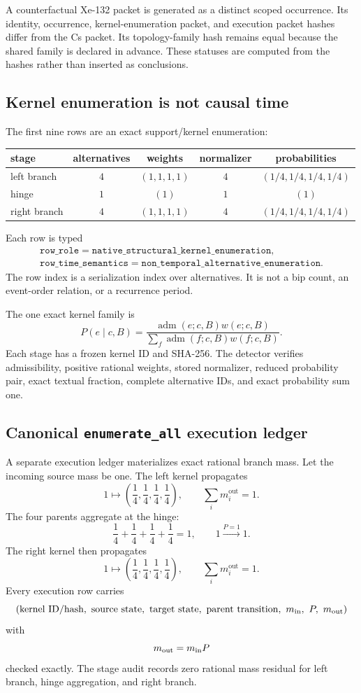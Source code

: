 A counterfactual Xe-132 packet is generated as a distinct scoped occurrence. Its identity, occurrence, kernel-enumeration packet, and execution packet hashes differ from the Cs packet. Its topology-family hash remains equal because the shared family is declared in advance. These statuses are computed from the hashes rather than inserted as conclusions.

\subsection{Kernel enumeration is not causal time}

The first nine rows are an exact support/kernel enumeration:
\begin{center}
\begin{tabular}{@{}lcccc@{}}
\toprule
stage & alternatives & weights & normalizer & probabilities\\
\midrule
left branch  & $4$ & $(1,1,1,1)$ & $4$ & $(1/4,1/4,1/4,1/4)$\\
hinge        & $1$ & $(1)$       & $1$ & $(1)$\\
right branch & $4$ & $(1,1,1,1)$ & $4$ & $(1/4,1/4,1/4,1/4)$\\
\bottomrule
\end{tabular}
\end{center}
Each row is typed
\[
\begin{gathered}
\texttt{row\_role}=\texttt{native\_structural\_kernel\_enumeration},\\
\texttt{row\_time\_semantics}=\texttt{non\_temporal\_alternative\_enumeration}.
\end{gathered}
\]
The row index is a serialization index over alternatives. It is not a bip count, an event-order relation, or a recurrence period.

The one exact kernel family is
\[
P(e\mid c,B)
=
\frac{\operatorname{adm}(e;c,B)w(e;c,B)}
{\sum_f\operatorname{adm}(f;c,B)w(f;c,B)}.
\]
Each stage has a frozen kernel ID and SHA-256. The detector verifies admissibility, positive rational weights, stored normalizer, reduced probability pair, exact textual fraction, complete alternative IDs, and exact probability sum one.

\subsection{Canonical \texttt{enumerate\_all} execution ledger}

A separate execution ledger materializes exact rational branch mass. Let the incoming source mass be one. The left kernel propagates
\[
1\longmapsto
\left(\frac14,\frac14,\frac14,\frac14\right),
\qquad
\sum_i m_i^{\mathrm{out}}=1.
\]
The four parents aggregate at the hinge:
\[
\frac14+\frac14+\frac14+\frac14=1,
\qquad
1\xrightarrow{P=1}1.
\]
The right kernel then propagates
\[
1\longmapsto
\left(\frac14,\frac14,\frac14,\frac14\right),
\qquad
\sum_i m_i^{\mathrm{out}}=1.
\]
Every execution row carries
\[
(\text{kernel ID/hash},\ \text{source state},\ \text{target state},\
\text{parent transition},\ m_{\rm in},\ P,\ m_{\rm out})
\]
with
\[
m_{\rm out}=m_{\rm in}P
\]
checked exactly. The stage audit records zero rational mass residual for left branch, hinge aggregation, and right branch.


